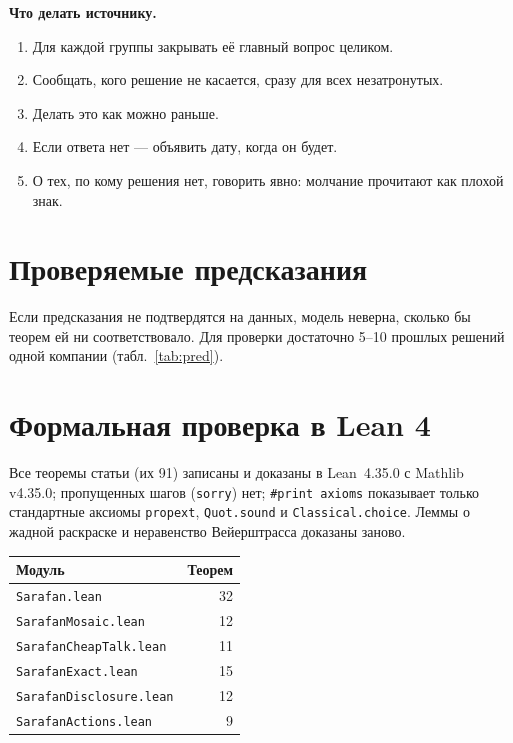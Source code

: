 \documentclass[10pt,a4paper,twocolumn]{article}
\theoremstyle{plain}
\newcommand{\lean}[1]{{\footnotesize\nolinkurl{#1}}}
\begin{document}
\textbf{Что делать источнику.}
\begin{enumerate}
\item Для каждой группы закрывать её главный вопрос целиком.
\item Сообщать, кого решение не касается, сразу для всех незатронутых.
\item Делать это как можно раньше.
\item Если ответа нет — объявить дату, когда он будет.
\item О тех, по кому решения нет, говорить явно: молчание прочитают как плохой знак.
\end{enumerate}

\section{Проверяемые предсказания}

Если предсказания не подтвердятся на данных, модель неверна, сколько бы теорем ей ни соответствовало. Для проверки достаточно 5–10 прошлых решений одной компании (табл.~\ref{tab:pred}).



\section{Формальная проверка в Lean 4}

Все теоремы статьи (их 91) записаны и доказаны в Lean~4.35.0 с Mathlib v4.35.0; пропущенных шагов (\lean{sorry}) нет; {\footnotesize\texttt{\#print axioms}} показывает только стандартные аксиомы \lean{propext}, \lean{Quot.sound} и \lean{Classical.choice}. Леммы о жадной раскраске и неравенство Вейерштрасса доказаны заново.

\begin{center}\small
\begin{tabular}{@{}lr@{}}
\toprule
Модуль & Теорем \\
\midrule
\lean{Sarafan.lean} & 32 \\
\lean{SarafanMosaic.lean} & 12 \\
\lean{SarafanCheapTalk.lean} & 11 \\
\lean{SarafanExact.lean} & 15 \\
\lean{SarafanDisclosure.lean} & 12 \\
\lean{SarafanActions.lean} & 9 \\
\bottomrule
\end{tabular}
\end{center}
\end{document}
